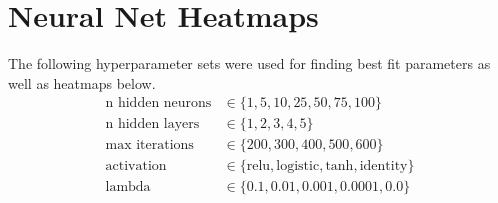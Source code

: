\documentclass[a4paper]{article}
\begin{document}
\section{Neural Net Heatmaps} \label{app:nn_heatmaps}
The following hyperparameter sets were used for finding best fit parameters as well as heatmaps below.
\begin{align*}
	\text{n hidden neurons} &\in \{1, 5, 10, 25, 50, 75, 100\}\\
	\text{n hidden layers} &\in \{1, 2, 3, 4, 5\}\\
	\text{max iterations} &\in \{200, 300, 400, 500, 600\}\\
	\text{activation} &\in \{\text{relu}, \text{logistic}, \text{tanh}, \text{identity}\}\\
	\text{lambda} &\in \{0.1, 0.01, 0.001, 0.0001, 0.0\}
\end{align*}
\end{document}
